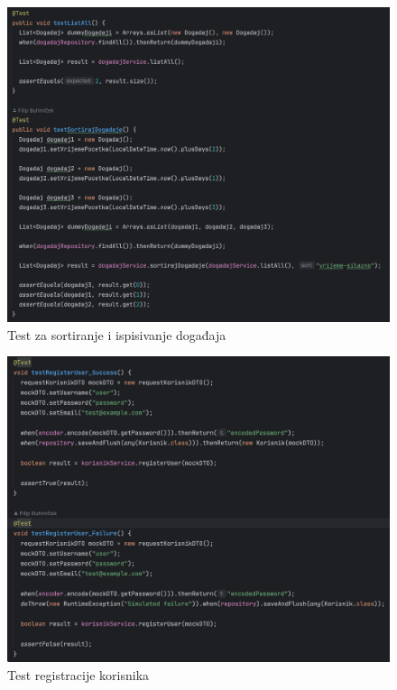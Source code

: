 			\begin{figure}[H]
				\includegraphics[scale=0.45]{testovi/dogadajTest.png}
				\centering
				\caption{Test za sortiranje i ispisivanje događaja}
				\label{fig:promjene}
			\end{figure}
			
			
			\begin{figure}[H]
				\includegraphics[scale=0.45]{testovi/korisnikTest.png}
				\centering
				\caption{Test registracije korisnika}
				\label{fig:promjene}
			\end{figure}
			
